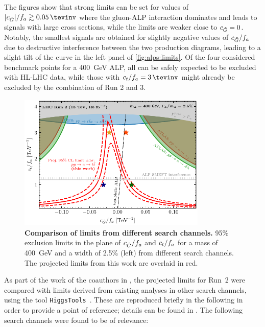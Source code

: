 The figures show that strong limits can be set for values of $|\cG|/f_a 	\gtrsim \SI{0.05}{\tevinv}$ where the gluon-ALP interaction dominates and leads to signals with large cross sections, while the limits are weaker close to $c_{\tilde{G}} = 0$. Notably, the smallest signals are obtained for slightly negative values of $c_{\tilde{G}}/f_a$ due to destructive interference between the two production diagrams, leading to a slight tilt of the curve in the left panel of \cref{fig:alps:limits}. Of the four considered benchmark points for a \SI{400}{\GeV} ALP, all can be safely expected to be excluded with HL-LHC data, while those with $\ct/f_a = \SI{3}{\tevinv}$ might already be excluded by the combination of Run 2 and 3.

\begin{figure}[t]
    \centering
    \includegraphics[width=0.8\textwidth]{figures/alps/sum400.pdf}
    \caption{
        \textbf{Comparison of limits from different search channels.} 95\% exclusion limits in the plane of $c_{\tilde{G}}/f_a$ and $c_t/f_a$ for a mass of \SI{400}{\GeV} and a width of 2.5\% (left) from different search channels. The projected limits from this work are overlaid in red.
    }
    \label{fig:alps:summary}
\end{figure}

As part of the work of the coauthors in , the projected limits for Run~2 were compared with limits derived from existing analyses in other search channels, using the tool \texttt{HiggsTools}~\cite{Bahl:2022igd}. These are reproduced briefly in the following in order to provide a point of reference; details can be found in . The following search channels were found to be of relevance:

